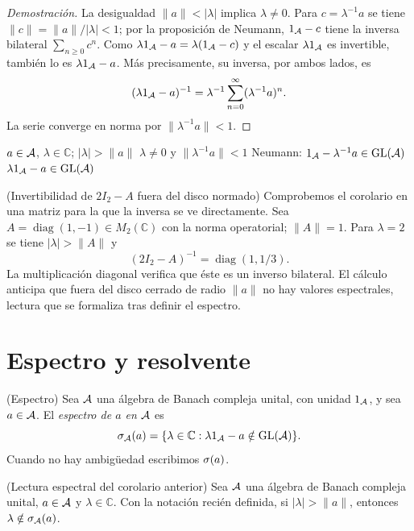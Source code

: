 \begin{proof}[Demostración]
La desigualdad $\|a\|<|\lambda|$ implica $\lambda\ne0$. Para
$c=\lambda^{-1}a$ se tiene $\|c\|=\|a\|/|\lambda|<1$;
por la proposición de Neumann, $1_\mathcal A-c$ tiene la inversa bilateral
$\sum_{n\ge0}c^n$. Como
$\lambda1_\mathcal A-a=\lambda(1_\mathcal A-c)$ y el escalar
$\lambda1_\mathcal A$ es invertible, también lo es $\lambda1_\mathcal A-a$.
Más precisamente, su inversa, por ambos lados, es
\[
 (\lambda1_\mathcal A-a)^{-1}
 =\lambda^{-1}\sum_{n=0}^{\infty}(\lambda^{-1}a)^n.
\]
La serie converge en norma por $\|\lambda^{-1}a\|<1$.
\end{proof}

\proofdiagram
{$a\in\mathcal A$, $\lambda\in\mathbb C$; $|\lambda|>\|a\|$}
{$\lambda\ne0$ y $\|\lambda^{-1}a\|<1$}
{Neumann: $1_\mathcal A-\lambda^{-1}a\in\operatorname{GL}(\mathcal A)$}
{$\lambda1_\mathcal A-a\in\operatorname{GL}(\mathcal A)$}

\begin{cthejemplo}{(Invertibilidad de $2I_2-A$ fuera del disco normado)}
Comprobemos el corolario en una matriz para la que la inversa se ve
directamente. Sea
$A=\operatorname{diag}(1,-1)\in M_2(\mathbb C)$ con la norma operatorial;
$\|A\|=1$. Para $\lambda=2$ se tiene $|\lambda|>\|A\|$ y
\[
  (2I_2-A)^{-1}=\operatorname{diag}(1,1/3).
\]
La multiplicación diagonal verifica que éste es un inverso bilateral.
El cálculo anticipa que fuera del disco cerrado de radio $\|a\|$ no hay
valores espectrales, lectura que se formaliza tras definir el espectro.
\end{cthejemplo}

\section{Espectro y resolvente}

\begin{cthdefinicion}{(Espectro)}
Sea $\mathcal A$ una álgebra de Banach compleja unital, con unidad $1_\mathcal A$,
y sea $a\in\mathcal A$. El \emph{espectro de $a$ en $\mathcal A$} es
\[
 \sigma_\mathcal A(a)=\{\lambda\in\mathbb C:\lambda1_\mathcal A-a\notin\operatorname{GL}(\mathcal A)\}.
\]
Cuando no hay ambigüedad escribimos $\sigma(a)$.
\end{cthdefinicion}

\begin{cthobservacion}{(Lectura espectral del corolario anterior)}
Sea $\mathcal A$ una álgebra de Banach compleja unital, $a\in\mathcal A$ y
$\lambda\in\mathbb C$. Con la notación recién definida, si
$|\lambda|>\|a\|$, entonces $\lambda\notin\sigma_\mathcal A(a)$.
\end{cthobservacion}

